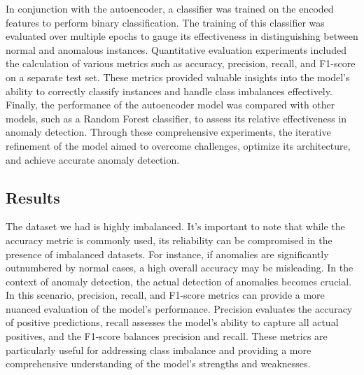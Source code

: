 \documentclass[10pt,twocolumn,letterpaper]{article}
\begin{document}
In conjunction with the autoencoder, a classifier was trained on the encoded features to perform binary classification. The training of this classifier was evaluated over 
multiple epochs to gauge its effectiveness in distinguishing between normal and anomalous instances. Quantitative evaluation experiments included the calculation of various 
metrics such as accuracy, precision, recall, and F1-score on a separate test set. These metrics provided valuable insights into the model's ability to correctly classify 
instances and handle class imbalances effectively. Finally, the performance of the autoencoder model was compared with other models, such as a Random Forest classifier, to 
assess its relative effectiveness in anomaly detection. Through these comprehensive experiments, the iterative refinement of the model aimed to overcome challenges, optimize 
its architecture, and achieve accurate anomaly detection.

\subsection{Results}
The dataset we had is highly imbalanced. It's important to note that while the accuracy metric is commonly used, its reliability can be 
compromised in the presence of imbalanced datasets. For instance, if anomalies are significantly outnumbered by normal cases, a high overall 
accuracy may be misleading. In the context of anomaly detection, the actual detection of anomalies becomes crucial.
In this scenario, precision, recall, and F1-score metrics can provide a more nuanced evaluation of the model's performance. 
Precision evaluates the accuracy of positive predictions, recall assesses the model's ability to capture all actual positives, and the F1-score 
balances precision and recall. These metrics are particularly useful for addressing class imbalance and providing a more comprehensive understanding of 
the model's strengths and weaknesses.
\end{document}
